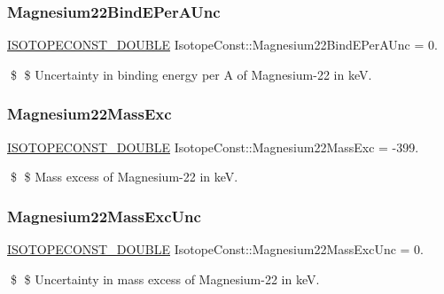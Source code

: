 \subsubsection{\texorpdfstring{Magnesium22\+Bind\+E\+Per\+A\+Unc}{Magnesium22BindEPerAUnc}}
{\footnotesize\ttfamily \mbox{\hyperlink{group___isotope_const-_macros_ga8f45a7272ce02c0b4c65c44636ed719a}{I\+S\+O\+T\+O\+P\+E\+C\+O\+N\+S\+T\+\_\+\+D\+O\+U\+B\+LE}} Isotope\+Const\+::\+Magnesium22\+Bind\+E\+Per\+A\+Unc = 0.}

\$ \$ Uncertainty in binding energy per A of Magnesium-\/22 in keV. \mbox{\label{group___isotope_const-_magnesium-_mg22_ga4ce30ca22e28186bdf379bd46e67a496}} 
\subsubsection{\texorpdfstring{Magnesium22\+Mass\+Exc}{Magnesium22MassExc}}
{\footnotesize\ttfamily \mbox{\hyperlink{group___isotope_const-_macros_ga8f45a7272ce02c0b4c65c44636ed719a}{I\+S\+O\+T\+O\+P\+E\+C\+O\+N\+S\+T\+\_\+\+D\+O\+U\+B\+LE}} Isotope\+Const\+::\+Magnesium22\+Mass\+Exc = -\/399.}

\$ \$ Mass excess of Magnesium-\/22 in keV. \mbox{\label{group___isotope_const-_magnesium-_mg22_gaa5effe472c939e5490d487c342e195ab}} 
\subsubsection{\texorpdfstring{Magnesium22\+Mass\+Exc\+Unc}{Magnesium22MassExcUnc}}
{\footnotesize\ttfamily \mbox{\hyperlink{group___isotope_const-_macros_ga8f45a7272ce02c0b4c65c44636ed719a}{I\+S\+O\+T\+O\+P\+E\+C\+O\+N\+S\+T\+\_\+\+D\+O\+U\+B\+LE}} Isotope\+Const\+::\+Magnesium22\+Mass\+Exc\+Unc = 0.}

\$ \$ Uncertainty in mass excess of Magnesium-\/22 in keV. \mbox{\label{group___isotope_const-_magnesium-_mg22_gab579bb50fec9bfdd5d6d9da3eec50d6a}} 
